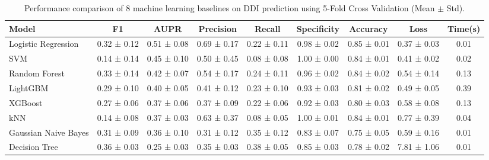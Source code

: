 \begin{table}[htbp]
\centering
\caption{Performance comparison of 8 machine learning baselines on DDI prediction using 5-Fold Cross Validation (Mean $\pm$ Std).}
\label{tab:ddi_baselines_cv}
\begin{tabular}{lcccccccc}
\toprule
Model & F1 & AUPR & Precision & Recall & Specificity & Accuracy & Loss & Time(s) \\
\midrule
Logistic Regression & 0.32 ± 0.12 & 0.51 ± 0.08 & 0.69 ± 0.17 & 0.22 ± 0.11 & 0.98 ± 0.02 & 0.85 ± 0.01 & 0.37 ± 0.03 & 0.01 \\
SVM & 0.14 ± 0.14 & 0.45 ± 0.10 & 0.50 ± 0.45 & 0.08 ± 0.08 & 1.00 ± 0.00 & 0.84 ± 0.01 & 0.41 ± 0.02 & 0.02 \\
Random Forest & 0.33 ± 0.14 & 0.42 ± 0.07 & 0.54 ± 0.17 & 0.24 ± 0.11 & 0.96 ± 0.02 & 0.84 ± 0.02 & 0.54 ± 0.14 & 0.13 \\
LightGBM & 0.29 ± 0.10 & 0.40 ± 0.05 & 0.41 ± 0.12 & 0.23 ± 0.10 & 0.93 ± 0.03 & 0.81 ± 0.02 & 0.49 ± 0.05 & 0.39 \\
XGBoost & 0.27 ± 0.06 & 0.37 ± 0.06 & 0.37 ± 0.09 & 0.22 ± 0.06 & 0.92 ± 0.03 & 0.80 ± 0.03 & 0.58 ± 0.08 & 0.13 \\
kNN & 0.14 ± 0.08 & 0.37 ± 0.03 & 0.63 ± 0.37 & 0.08 ± 0.05 & 1.00 ± 0.01 & 0.84 ± 0.01 & 0.77 ± 0.39 & 0.04 \\
Gaussian Naive Bayes & 0.31 ± 0.09 & 0.36 ± 0.10 & 0.31 ± 0.12 & 0.35 ± 0.12 & 0.83 ± 0.07 & 0.75 ± 0.05 & 0.59 ± 0.16 & 0.01 \\
Decision Tree & 0.36 ± 0.03 & 0.25 ± 0.03 & 0.35 ± 0.03 & 0.38 ± 0.05 & 0.85 ± 0.03 & 0.78 ± 0.02 & 7.81 ± 1.06 & 0.01 \\
\bottomrule
\end{tabular}
\end{table}